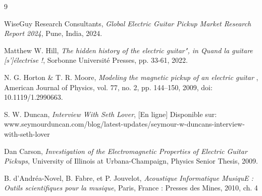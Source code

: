 \documentclass[a4paper,11pt]{article}
\begin{document}
\newpage

\begin{thebibliography}{9}

WiseGuy Research Consultants, \textit{Global Electric Guitar Pickup Market Research Report 2024}, Pune, India, 2024.

Matthew W. Hill, \textit{The hidden history of the electric guitar", in Quand la guitare [s']électrise !}, Sorbonne Université Presses, pp. 33-61, 2022.

N. G. Horton & T. R. Moore, \textit{Modeling the magnetic pickup of an electric guitar }, American Journal of Physics, vol. 77, no. 2, pp. 144–150, 2009, doi: 10.1119/1.2990663.

S. W. Duncan, \textit{Interview With Seth Lover}, [En ligne] Disponible sur: www.seymourduncan.com/blog/latest-updates/seymour-w-duncans-interview-with-seth-lover

Dan Carson, \textit{Investigation of the Electromagnetic Properties of Electric Guitar Pickups}, University of Illinois at Urbana-Champaign, Physics Senior Thesis, 2009.

B. d’Andréa-Novel, B. Fabre, et P. Jouvelot, \textit{Acoustique Informatique MusiquE : Outils scientifiques pour la musique}, Paris, France : Presses des Mines, 2010, ch. 4

\end{thebibliography}
\end{document}
